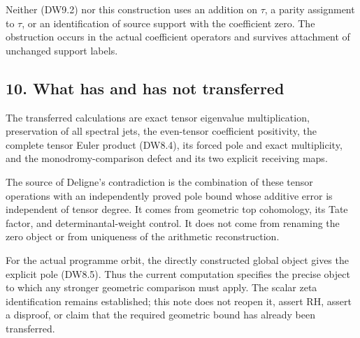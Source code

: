 Neither (DW9.2) nor this construction uses an addition on \(\tau\), a
parity assignment to \(\tau\), or an identification of source support
with the coefficient zero. The obstruction occurs in the actual
coefficient operators and survives attachment of unchanged support
labels.

\subsection{10. What has and has not
transferred}\label{what-has-and-has-not-transferred}

The transferred calculations are exact tensor eigenvalue multiplication,
preservation of all spectral jets, the even-tensor coefficient
positivity, the complete tensor Euler product (DW8.4), its forced pole
and exact multiplicity, and the monodromy-comparison defect and its two
explicit receiving maps.

The source of Deligne's contradiction is the combination of these tensor
operations with an independently proved pole bound whose additive error
is independent of tensor degree. It comes from geometric top cohomology,
its Tate factor, and determinantal-weight control. It does not come from
renaming the zero object or from uniqueness of the arithmetic
reconstruction.

For the actual programme orbit, the directly constructed global object
gives the explicit pole (DW8.5). Thus the current computation specifies
the precise object to which any stronger geometric comparison must
apply. The scalar zeta identification remains established; this note
does not reopen it, assert RH, assert a disproof, or claim that the
required geometric bound has already been transferred.
